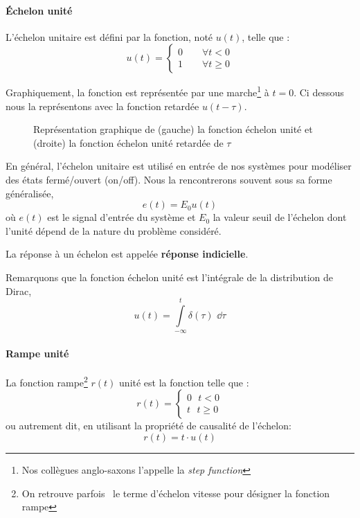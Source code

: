 \paragraph{\'Echelon unité}

L'échelon unitaire est défini par la fonction, noté $u(t)$, telle que :
$$
u(t)=
\begin{cases} 
0 \qquad \forall t<0    \\ 
1 \qquad \forall t\geq 0 
\end{cases}
$$

Graphiquement, la fonction est représentée par une marche\footnote{Nos 
collègues anglo-saxons l'appelle la \og\emph{step function}\fg} à $t=0$. 
Ci dessous nous la représentons avec la fonction retardée $u(t-\tau)$.
\begin{figure}[!h]
\begin{center}

\end{center}
    \caption{Représentation graphique de (gauche) la fonction échelon unité et (droite) la fonction 
    échelon unité retardée de $\tau$\label{fig-echelon}}
\end{figure}

En général, l'échelon unitaire est utilisé en entrée de nos systèmes pour 
modéliser des états fermé/ouvert (\og on/off\fg).
Nous la rencontrerons souvent sous sa forme généralisée, 
$$
e(t)=E_0u(t)
$$
où $e(t)$ est le signal d'entrée du système et $E_0$ la valeur seuil de l'échelon dont 
l'unité dépend de la nature du problème considéré.

La réponse à un échelon est appelée \textbf{réponse indicielle}.

Remarquons que la fonction échelon unité est l'intégrale de la distribution de Dirac,
$$
u(t)=\int\limits_{-\infty}^{t} \delta(\tau)\,\,\dd{\tau}
$$

\paragraph{Rampe unité}

La fonction rampe\footnote{On retrouve parfois~\cite{sueurautomatique} le terme 
d'échelon vitesse pour désigner la fonction rampe} $r(t)$ unité est la fonction telle que :
$$
r(t)=
\begin{cases}
	0\,\,\,\,t<0 \\
	t\,\,\,\,t\geq0 
\end{cases}
$$
ou autrement dit, en utilisant la propriété de causalité de l'échelon:
$$
r(t)=t\cdot u(t)
$$


